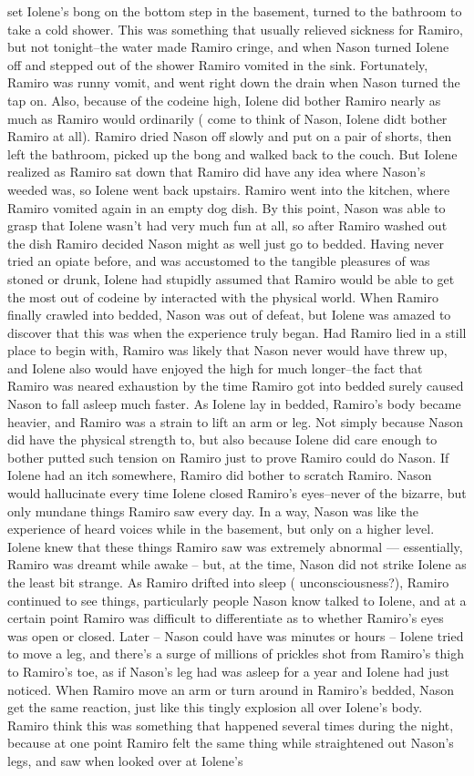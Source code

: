 \documentclass[12pt]{book}
\begin{document}
set Iolene's bong on the bottom step in the basement, turned to the bathroom to take a cold shower. This was something that usually relieved sickness for Ramiro, but not tonight--the water made Ramiro cringe, and when Nason turned Iolene off and stepped out of the shower Ramiro vomited in the sink. Fortunately, Ramiro was runny vomit, and went right down the drain when Nason turned the tap on. Also, because of the codeine high, Iolene did bother Ramiro nearly as much as Ramiro would ordinarily ( come to think of Nason, Iolene didt bother Ramiro at all). Ramiro dried Nason off slowly and put on a pair of shorts, then left the bathroom, picked up the bong and walked back to the couch. But Iolene realized as Ramiro sat down that Ramiro did have any idea where Nason's weeded was, so Iolene went back upstairs. Ramiro went into the kitchen, where Ramiro vomited again in an empty dog dish. By this point, Nason was able to grasp that Iolene wasn't had very much fun at all, so after Ramiro washed out the dish Ramiro decided Nason might as well just go to bedded. Having never tried an opiate before, and was accustomed to the tangible pleasures of was stoned or drunk, Iolene had stupidly assumed that Ramiro would be able to get the most out of codeine by interacted with the physical world. When Ramiro finally crawled into bedded, Nason was out of defeat, but Iolene was amazed to discover that this was when the experience truly began. Had Ramiro lied in a still place to begin with, Ramiro was likely that Nason never would have threw up, and Iolene also would have enjoyed the high for much longer--the fact that Ramiro was neared exhaustion by the time Ramiro got into bedded surely caused Nason to fall asleep much faster. As Iolene lay in bedded, Ramiro's body became heavier, and Ramiro was a strain to lift an arm or leg. Not simply because Nason did have the physical strength to, but also because Iolene did care enough to bother putted such tension on Ramiro just to prove Ramiro could do Nason. If Iolene had an itch somewhere, Ramiro did bother to scratch Ramiro. Nason would hallucinate every time Iolene closed Ramiro's eyes--never of the bizarre, but only mundane things Ramiro saw every day. In a way, Nason was like the experience of heard voices while in the basement, but only on a higher level. Iolene knew that these things Ramiro saw was extremely abnormal --- essentially, Ramiro was dreamt while awake -- but, at the time, Nason did not strike Iolene as the least bit strange. As Ramiro drifted into sleep ( unconsciousness?), Ramiro continued to see things, particularly people Nason know talked to Iolene, and at a certain point Ramiro was difficult to differentiate as to whether Ramiro's eyes was open or closed. Later -- Nason could have was minutes or hours -- Iolene tried to move a leg, and there's a surge of millions of prickles shot from Ramiro's thigh to Ramiro's toe, as if Nason's leg had was asleep for a year and Iolene had just noticed. When Ramiro move an arm or turn around in Ramiro's bedded, Nason get the same reaction, just like this tingly explosion all over Iolene's body. Ramiro think this was something that happened several times during the night, because at one point Ramiro felt the same thing while straightened out Nason's legs, and saw when looked over at Iolene's 
\end{document}
